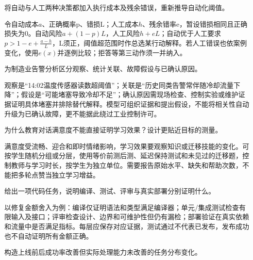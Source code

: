 \begin{exercises}
\begin{exercise} 将自动与人工两种决策都加入执行成本及残余错误，重新推导自动化阈值。

\begin{solution}
令自动成本$a$、正确概率p、错损L；人工成本$h$、残余错率e，暂设错损相同且正确损失为0。自动风险$a+(1-p)L$，人工风险$h+eL$；自动优于人工要求 $p>1-e+\frac{a-h}{L}$，L须正，阈值超范围时作总选某行动解释。若人工错误也依案例变化，使用$e(x)$并逐例比较；拒答等第三动作须一并纳入。
\end{solution}
\end{exercise}

\begin{exercise}\optional 为制造业告警分析区分观察、统计关联、故障假设与已确认原因。

\begin{solution}
观察是“14:02温度传感器读数超阈值”；关联是“历史同类告警常伴随冷却流量下降”；假设是“可能堵塞导致冷却不足”；确认原因需现场检查、控制实验或维护证据证明具体堵塞并排除替代解释。模型可组织证据和提出假设，不能将相关性自动升级为已确认故障，更不能据此绕过工业控制许可。
\end{solution}
\end{exercise}

\begin{exercise}\optional 为什么教育对话满意度不能直接证明学习效果？设计更贴近目标的测量。

\begin{solution}
满意度受流畅、迎合和即时情绪影响，学习效果要观察知识或迁移技能的变化。可按学生随机分组或分层，使用等价前测后测、延迟保持测试和未见过的迁移题，控制教师与学习时长，按学生为独立单位。需要报告原始水平、缺失和帮助次数，不能把多轮点赞当独立学习增益。
\end{solution}
\end{exercise}

\begin{exercise}\optional 给出一项代码任务，说明编译、测试、评审与真实部署分别证明什么。

\begin{solution}
以修复金额舍入为例：编译仅证明语法和类型满足编译器；单元/集成测试检查有限输入及接口；评审检查设计、边界和可维护性但仍有漏检；部署验证在真实依赖和流量中是否满足指标。每层应保存对应证据，测试通过不代表已发布，发布成功也不自动证明所有金额正确。
\end{solution}
\end{exercise}

\begin{exercise} 构造上线前后成功率改善但实际处理能力未改善的任务分布变化。


\end{exercise}
\end{exercises}
